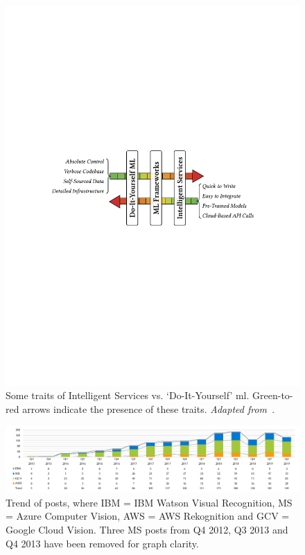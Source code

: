 \begin{figure}
  \centering
  \includegraphics[width=.8\linewidth]{traits}
  \caption[Traits of intelligent web services compared to DIY ML]{Some traits of Intelligent Services vs. `Do-It-Yourself' \gls{ml}. Green-to-red arrows indicate the presence of these traits. \textit{Adapted from~\citet{Ortiz:2017wg}}.}
  \label{icse2020:fig:traits}
\end{figure}

\begin{figure}[tb]
  \includegraphics[width=\linewidth]{posts-trend}
  \caption[Trend of Stack Overflow posts discussing computer vision services]{Trend of posts, where IBM = IBM Watson Visual Recognition, MS = Azure Computer Vision, AWS = AWS Rekognition and GCV = Google Cloud Vision. Three MS posts from Q4 2012, Q3 2013 and Q4 2013 have been removed for graph clarity.}
  \label{icse2020:fig:posts-trend}
\end{figure}

